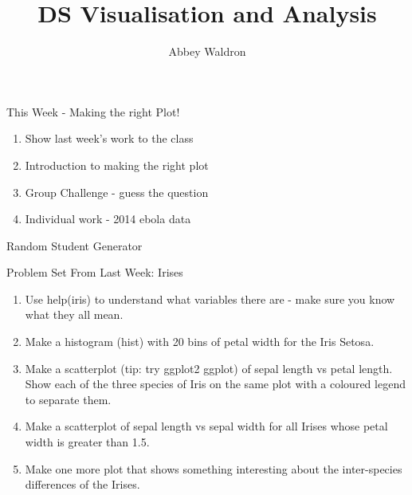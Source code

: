 \documentclass{beamer}
\newif\ifplacelogo
\begin{document}
\setlength{\unitlength}{1mm}
\title{DS Visualisation and Analysis}
\author[Abbey Waldron]{Abbey Waldron}
\date[September 11th, 2015]{}





{
\placelogofalse
\begin{frame}
  \titlepage
\end{frame}
}



\begin{frame}{This Week - Making the right Plot!}

\begin{enumerate}
\item Show last week's work to the class
\item Introduction to making the right plot
\item Group Challenge - guess the question
\item Individual work - 2014 ebola data
\end{enumerate}

\end{frame}



\begin{frame}{Random Student Generator}

\end{frame}


\begin{frame}{Problem Set From Last Week: Irises}

\begin{enumerate}
\item Use help(iris) to understand what variables there are - make sure you know what they all mean.
\item Make a histogram (hist) with 20 bins of petal width for the Iris Setosa.
\item Make a scatterplot (tip: try ggplot2 ggplot) of sepal length vs petal length.  Show each of the three species of Iris on the same plot with a coloured legend to separate them.
\item Make a scatterplot of sepal length vs sepal width for all Irises whose petal width is greater than 1.5.
\item Make one more plot that shows something interesting about the inter-species differences of the Irises.
\end{enumerate}


\end{frame}
\end{document}
